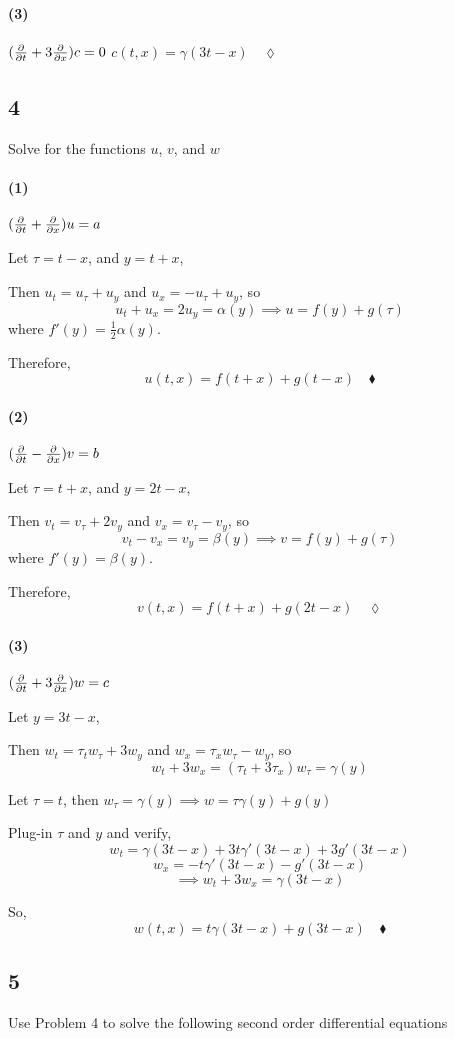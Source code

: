 \documentclass{article}
\begin{document}
\paragraph{(3)} $(\pdv{t}+3\pdv{x})c = 0 $ $c(t,x) =
\gamma(3t-x)\quad \lozenge$
\newpage
\subsection*{4} Solve for the functions $u$, $v$, and $w$
\paragraph{(1)} $(\pdv{t}+\pdv{x})u = a$


Let $\tau = t-x$, and $y = t+x$,

Then $u_t = u_{\tau} +u_y$ and $u_x = -u_{\tau}+ u_y$, so
\[u_t+u_x = 2u_y = \alpha(y) \implies u = f(y) + g(\tau)\]
where $f'(y) = \frac{1}{2}\alpha(y)$.

Therefore, \[u(t,x) = f(t+x)+g(t-x)\quad \blacklozenge\]
\paragraph{(2)} $(\pdv{t}-\pdv{x})v = b$


Let $\tau = t+x$, and $y = 2t-x$,

Then $v_t = v_{\tau} +2v_y$ and $v_x = v_{\tau}- v_y$, so
\[v_t-v_x = v_y = \beta(y) \implies v = f(y) + g(\tau)\]
where $f'(y) = \beta(y)$.

Therefore, \[v(t,x) = f(t+x)+g(2t-x)\quad \lozenge\]

\paragraph{(3)} $(\pdv{t}+3\pdv{x})w = c$

Let $y = 3t-x$,

Then $w_t = \tau_tw_{\tau} +3w_y$ and $w_x = \tau_xw_{\tau}- w_y$, so
\[w_t+3w_x = (\tau_t+3\tau_x)w_{\tau} = \gamma(y)\]

Let $\tau = t$, then $w_{\tau} = \gamma(y) \implies w =
\tau\gamma(y)+g(y)$

Plug-in $\tau$ and $y$ and verify,
\[w_t = \gamma(3t-x) +3t\gamma'(3t-x) +3g'(3t-x)\]
\[w_x = -t\gamma'(3t-x) -g'(3t-x) \]
\[\implies w_t+3w_x = \gamma(3t-x)\]

So, \[w(t,x) = t\gamma(3t-x)+g(3t-x)\quad\blacklozenge\]
\newpage
\subsection*{5} Use Problem 4 to solve the following second order differential equations
\end{document}

